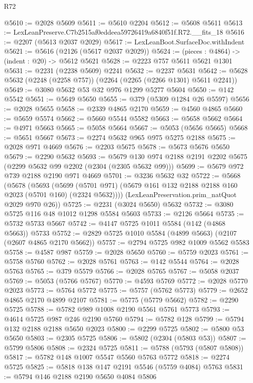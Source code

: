 \begin{lexlean}{R72}
\begin{coremodule}
@5610 := @2028 @5609
@5611 := @5610 @2204
@5612 := @5608 @5611
@5613 := LexLeanPreserve.C7b2515af0eddeea59726419a6840f51f.R72.__fits_18
@5616 := @2207 (@5613 @2037 @2029)
@5617 := LexLeanBoot.SurfaceDoc.withIndent
@5621 := @5616 (@2126 (@5617 @2037 @2029))
@5624 := (pieces : @4864) -> (indent : @20) -> @5612 @5621
@5628 := @2223 @757 @5611 @5621 @1301
@5631 := @2231 (@2238 @5609) @2241
@5632 := @2237 @5631
@5642 := @5628 @5632 (@2248 (@2258 @757)) (@2264 (@2265 (@2266 @1301) @5611 @2241))
@5649 := @3080 @5632 @53 @32 @976 @1299 @5277 @5604
@5650 := @142 @5542
@5651 := @5649 @5650
@5655 := @379 (@5309 @1284 @26 @5597)
@5656 := @2028 @5655
@5658 := @2339 @4865 @2170
@5659 := @4560 @4865
@5660 := @5659 @5574
@5662 := @5660 @5544 @5582
@5663 := @5658 @5662
@5664 := @4971 @5663
@5665 := @5058 @5664
@5667 := @5053 (@5656 @5665)
@5668 := @5651 @5667
@5673 := @2274 @5632 @965 @975 @5275 @2188
@5675 := @2028 @971 @4669
@5676 := @2203 @5675
@5678 := @5673 @5676 @5650
@5679 := @2290 @5632
@5693 := @5679 @130 @974 @2188 @2191 @2202 @5675 (@2299 @5632 @99 @2202 (@2304 (@2305 @5632 @99)))
@5699 := @5679 @972 @739 @2188 @2190 @971 @4669
@5701 := @3236 @5632 @32
@5722 := @5668
    (@5678
      (@5693
        (@5699 (@5701 @971) (@5679 @161 @132 @2188 @2188 @160 @2023 (@5701 @160) (@2324 @5632))))
      (LexLeanPreservation.prim_natQuot @2029 @970 @26))
@5725 := @2231 (@3024 @5650) @5632
@5732 := @3080 @5725 @116 @48 @1012 @1298 @5584 @5603
@5733 := @2126 @5664
@5735 := @5732 @5733 @5667
@5742 := @4147 @5725 @1011 @5584 (@142 (@4868 @5663)) @5733
@5752 := @2829 @5725 @1010 @5584 (@4899 @5663) (@2107 (@2607 @4865 @2170 @5662))
@5757 := @2794 @5725 @982 @1009 @5562 @5583
@5758 := @4587 @987
@5759 := @2028 @5650
@5760 := @5759 @2023
@5761 := @5758 @5760
@5762 := @2028 @5761
@5763 := @142 @5544
@5764 := @2028 @5763
@5765 := @379 @5579
@5766 := @2028 @5765
@5767 := @5058 @2037
@5769 := @5053 (@5766 @5767)
@5770 := @4593 @5769
@5772 := @2028 @5770 @2023
@5773 := @5764 @5772
@5775 := @5757 (@5762 @5773)
@5779 := @2652 @4865 @2170 @4899 @2107
@5781 := @5775 (@5779 @5662)
@5782 := @2290 @5725
@5788 := @5782 @989 @1008 @2190 @5561 @5761 @5773
@5793 := @4614 @5725 @987 @246 @2190 @5760
@5794 := @5782 @128
@5799 := @5794 @132 @2188 @2188 @5650 @2023
@5800 := @2299 @5725
@5802 := @5800 @53 @5650
@5803 := @2305 @5725
@5806 := @5802 (@2304 (@5803 @53))
@5807 := @5799 @5806
@5808 := @2324 @5725
@5811 := @5788 (@5793 (@5807 @5808))
@5817 := @5782 @148 @1007 @5547 @5560 @5763 @5772
@5818 := @2274 @5725
@5825 := @5818 @138 @147 @2191 @5546 (@5759 @4084) @5763
@5831 := @5794 @146 @2188 @2190 @5650 @4084 @5806

\end{coremodule}
\end{lexlean}

